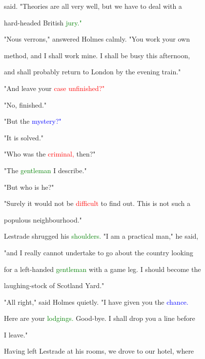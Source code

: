  said. \textcolor{BurntOrange}{"Theories} are all very well, but we have to \textcolor{BurntOrange}{deal} with a

 hard-headed British \textcolor{green}{jury."}



 "Nous verrons," answered Holmes calmly. "You work your own

 method, and I shall work mine. I shall be busy this afternoon,

 and shall probably return to London by the evening train."



 "And \textcolor{BurntOrange}{leave} your \textcolor{red}{case} \textcolor{red}{unfinished?"}



 "No, finished."



 "But the \textcolor{blue}{mystery?"}



 "It is solved."



 "Who was the \textcolor{red}{criminal,} then?"



 "The \textcolor{green}{gentleman} I describe."



 "But who is he?"



 "Surely it would not be \textcolor{red}{difficult} to find out. This is not such a

 populous neighbourhood."



 Lestrade shrugged his \textcolor{green}{shoulders.} "I am a practical man," he said,

 "and I really cannot undertake to go about the country looking

 for a left-handed \textcolor{green}{gentleman} with a game leg. I should become the

 laughing-stock of Scotland Yard."



 "All right," said Holmes quietly. "I have given you the \textcolor{blue}{chance.}

 Here are your \textcolor{green}{lodgings.} Good-bye. I shall drop you a line before

 I \textcolor{BurntOrange}{leave."}



 Having left Lestrade at his rooms, we drove to our hotel, where

